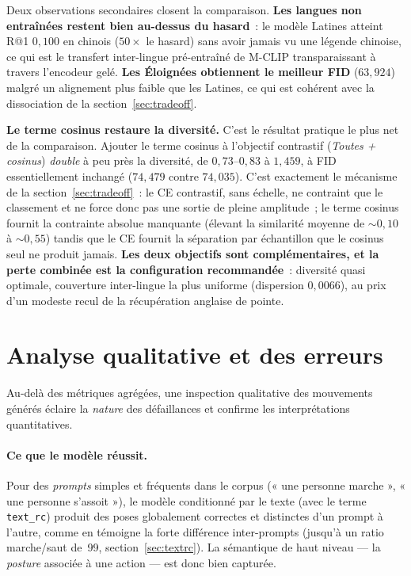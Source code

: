 \documentclass[12pt,a4paper,oneside]{report}
\theoremstyle{definition}
\theoremstyle{plain}
\begin{document}
Deux observations secondaires closent la comparaison. \textbf{Les langues non
entraînées restent bien au-dessus du hasard}~: le modèle Latines atteint R@1
$0{,}100$ en chinois ($50\times$ le hasard) sans avoir jamais vu une légende
chinoise, ce qui est le transfert inter-lingue pré-entraîné de M-CLIP transparaissant
à travers l'encodeur gelé. \textbf{Les Éloignées obtiennent le meilleur FID}
($63{,}924$) malgré un alignement plus faible que les Latines, ce qui est cohérent
avec la dissociation de la section~\ref{sec:tradeoff}.

\textbf{Le terme cosinus restaure la diversité.} C'est le résultat pratique le plus
net de la comparaison. Ajouter le terme cosinus à l'objectif contrastif
(\emph{Toutes + cosinus}) \emph{double} à peu près la diversité, de $0{,}73$--$0{,}83$
à $1{,}459$, à FID essentiellement inchangé ($74{,}479$ contre $74{,}035$). C'est
exactement le mécanisme de la section~\ref{sec:tradeoff}~: le CE contrastif, sans
échelle, ne contraint que le classement et ne force donc pas une sortie de pleine
amplitude~; le terme cosinus fournit la contrainte absolue manquante (élevant la
similarité moyenne de ${\sim}0{,}10$ à ${\sim}0{,}55$) tandis que le CE fournit la
séparation par échantillon que le cosinus seul ne produit jamais. \textbf{Les deux
objectifs sont complémentaires, et la perte combinée est la configuration
recommandée}~: diversité quasi optimale, couverture inter-lingue la plus uniforme
(dispersion $0{,}0066$), au prix d'un modeste recul de la récupération anglaise de
pointe.

\section{Analyse qualitative et des erreurs}
\label{sec:erreurs}

Au-delà des métriques agrégées, une inspection qualitative des mouvements générés
éclaire la \emph{nature} des défaillances et confirme les interprétations
quantitatives.

\paragraph{Ce que le modèle réussit.} Pour des \emph{prompts} simples et fréquents
dans le corpus (« une personne marche », « une personne s'assoit »), le modèle
conditionné par le texte (avec le terme \texttt{text\_rc}) produit des poses
globalement correctes et distinctes d'un prompt à l'autre, comme en témoigne la
forte différence inter-prompts (jusqu'à un ratio marche/saut de~99,
section~\ref{sec:textrc}). La sémantique de haut niveau --- la \emph{posture}
associée à une action --- est donc bien capturée.
\end{document}
